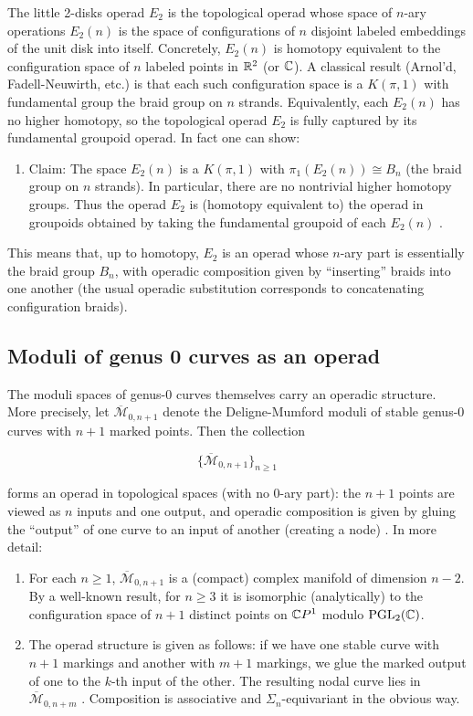 The little 2-disks operad $E_2$ is the topological operad whose space of $n$-ary operations $E_2(n)$ is the space of configurations of $n$ disjoint labeled embeddings of the unit disk into itself.  Concretely, $E_2(n)$ is homotopy equivalent to the configuration space of $n$ labeled points in $\mathbb{R}^2$ (or $\mathbb{C}$).  A classical result (Arnol'd, Fadell-Neuwirth, etc.) is that each such configuration space is a $K(\pi,1)$ with fundamental group the braid group on $n$ strands.  Equivalently, each $E_2(n)$ has no higher homotopy, so the topological operad $E_2$ is fully captured by its fundamental groupoid operad.  In fact one can show:

\begin{enumerate}
    \item Claim: The space $E_2(n)$ is a $K(\pi,1)$ with $\pi_1(E_2(n))\cong B_n$ (the braid group on $n$ strands).  In particular, there are no nontrivial higher homotopy groups.  Thus the operad $E_2$ is (homotopy equivalent to) the operad in groupoids obtained by taking the fundamental groupoid of each $E_2(n)$ \cite{C_2014}.
\end{enumerate}

This means that, up to homotopy, $E_2$ is an operad whose $n$-ary part is essentially the braid group $B_n$, with operadic composition given by “inserting” braids into one another (the usual operadic substitution corresponds to concatenating configuration braids).

\subsection{Moduli of genus 0 curves as an operad}

The moduli spaces of genus-0 curves themselves carry an operadic structure.  More precisely, let $\overline{\mathcal{M}}_{0,n+1}$ denote the Deligne-Mumford moduli of stable genus-0 curves with $n+1$ marked points.  Then the collection

$$
  \{\overline{\mathcal{M}}_{0,n+1}\}_{n\ge1}
$$

forms an operad in topological spaces (with no $0$-ary part): the $n+1$ points are viewed as $n$ inputs and one output, and operadic composition is given by gluing the “output” of one curve to an input of another (creating a node) \cite{de_Brito_Horel_Robertson_2019}. In more detail:

\begin{enumerate}
    \item For each $n\ge1$, $\overline{\mathcal{M}}_{0,n+1}$ is a (compact) complex manifold of dimension $n-2$.  By a well-known result, for $n\ge3$ it is isomorphic (analytically) to the configuration space of $n+1$ distinct points on $\mathbb{C} P^1$ modulo $\mathrm{PGL}_2(\mathbb{C})$.
    \item The operad structure is given as follows: if we have one stable curve with $n+1$ markings and another with $m+1$ markings, we glue the marked output of one to the $k$-th input of the other.  The resulting nodal curve lies in $\overline{\mathcal{M}}_{0,n+m}$ \cite{de_Brito_Horel_Robertson_2019}. Composition is associative and $\Sigma_n$-equivariant in the obvious way.
\end{enumerate}

